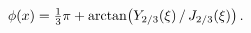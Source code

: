 \[\mathop{\phi\/}\nolimits\!\left(x\right)=\tfrac{1}{3}\pi+\mathop{\mathrm{%
arctan}\/}\nolimits\!\left(\mathop{Y_{2/3}\/}\nolimits\!\left(\xi\right)/%
\mathop{J_{2/3}\/}\nolimits\!\left(\xi\right)\right).\]